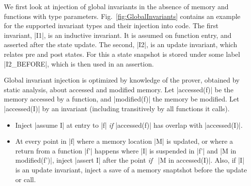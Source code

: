 

We first look at injection of global invariants in the absence of memory and
functions with type parameters. Fig.~\ref{fig:GlobalInvariants} contains an
example for the supported invariant types and their injection into code. The
first invariant, |I1|, is an inductive invariant. It is assumed on function
entry, and asserted after the state update. The second, |I2|, is an update
invariant, which relates pre and post states. For this a state snapshot is
stored under some label |I2_BEFORE|, which is then used in an assertion.

Global invariant injection is optimized by knowledge of the prover, obtained by
static analysis, about accessed and modified memory.  Let |accessed(f)| be the
memory accessed by a function, and |modified(f)| the memory be modified. Let
|accessed(I)| by an invariant (including transitively by all functions it
calls).

\begin{itemize}
\item Inject |assume I| at entry to |f| \emph{if} |accessed(f)| has overlap with
  |accessed(I)|.
\item At every point in |f| where a memory location |M| is updated, or where a
  return from a function |f'| happens where |I| is suspended in |f'|
  and |M in modified(f')|,
  inject |assert I| after the point \emph{if}~%
  |M in accessed(I)|. Also, if |I| is an update invariant, inject a save of
  a memory snaptshot before the update or call.
\end{itemize}

